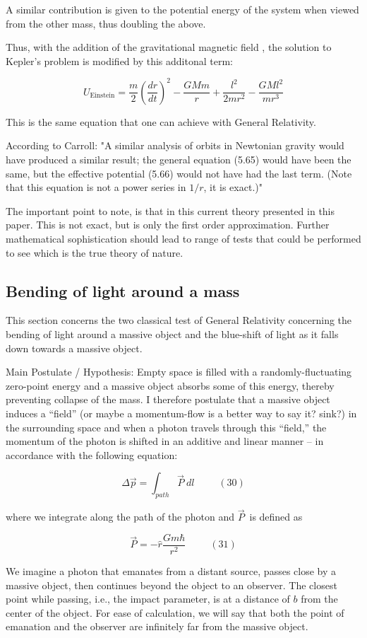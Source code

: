 \documentclass {article}
\begin{document}
A similar contribution is given to the potential energy of the system when viewed from the other mass, thus doubling the above. 

Thus, with the addition of the gravitational magnetic field , the solution to Kepler's problem is modified by this additonal term:

$$ U_{\text{Einstein}} = \frac m 2 (\frac {dr} {dt})^2 - \frac {GMm} r + \frac {l^2} {2mr^2} - \frac {GMl^2}{mr^3}$$

This is the same equation that one can achieve with General Relativity. 

According to Carroll: "A similar analysis of orbits in Newtonian gravity would have produced a similar result; the general equation (5.65) would have been the same, but the effective potential (5.66) would not have had the last term. (Note that this equation is not a power series in $1/r$, it is exact.)"

The important point to note, is that in this current theory presented in this paper. This is not exact, but is only the first order approximation. Further mathematical sophistication should lead to range of tests that could be performed to see which is the true theory of nature.


\newpage
\subsection{Bending of light around a mass}
This section concerns the two classical test of General Relativity concerning the bending of light around a massive object and the blue-shift of light as it falls down towards a massive object.

Main Postulate / Hypothesis: Empty space is filled with a randomly-fluctuating zero-point energy and a massive object absorbs some of this energy, thereby preventing collapse of the mass. I therefore postulate that a massive object induces a “field” (or maybe a momentum-flow is a better way to say it? sink?) in the surrounding space and when a photon travels through this “field,” the momentum of the photon is shifted in an additive and linear manner – in accordance with the following equation: 

$$\Delta \vec p = \int_{path} \vec P ~ dl ~~~~~~~~~~~ (30)$$

where we integrate along the path of the photon and $\vec P$ is defined as

$$\vec P = - \hat r \frac {Gm\hbar}{r^2} ~~~~~~~~~~~ (31)$$

We imagine a photon that emanates from a distant source, passes close by a massive object, then continues beyond the object to an observer. The closest point while passing, i.e., the impact parameter, is at a distance of $b$ from the center of the object. For ease of calculation, we will say that both the point of emanation and the observer are infinitely far from the massive object.
\end{document}
